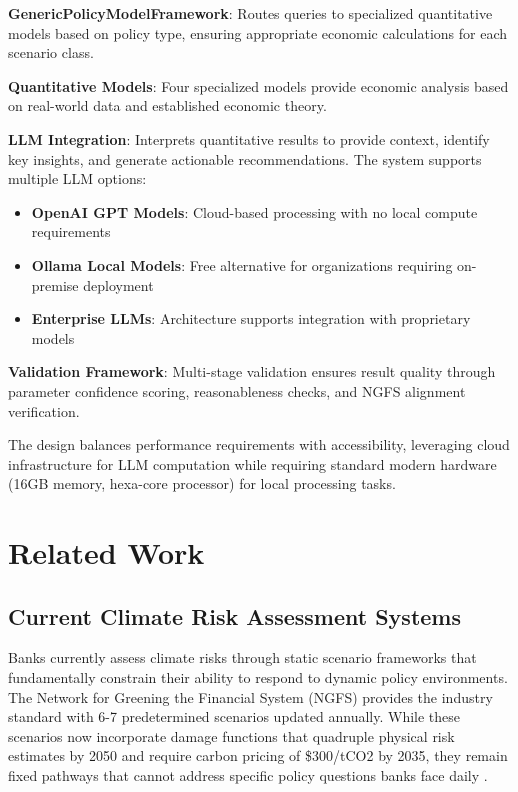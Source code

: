 \documentclass[conference]{IEEEtran}
\begin{document}
\textbf{GenericPolicyModelFramework}: Routes queries to specialized quantitative models based on policy type, ensuring appropriate economic calculations for each scenario class.

\textbf{Quantitative Models}: Four specialized models provide economic analysis based on real-world data and established economic theory.

\textbf{LLM Integration}: Interprets quantitative results to provide context, identify key insights, and generate actionable recommendations. The system supports multiple LLM options:
\begin{itemize}
\item \textbf{OpenAI GPT Models}: Cloud-based processing with no local compute requirements
\item \textbf{Ollama Local Models}: Free alternative for organizations requiring on-premise deployment
\item \textbf{Enterprise LLMs}: Architecture supports integration with proprietary models
\end{itemize}

\textbf{Validation Framework}: Multi-stage validation ensures result quality through parameter confidence scoring, reasonableness checks, and NGFS alignment verification.

The design balances performance requirements with accessibility, leveraging cloud infrastructure for LLM computation while requiring standard modern hardware (16GB memory, hexa-core processor) for local processing tasks.

\section{Related Work}

\subsection{Current Climate Risk Assessment Systems}

Banks currently assess climate risks through static scenario frameworks that fundamentally constrain their ability to respond to dynamic policy environments. The Network for Greening the Financial System (NGFS) provides the industry standard with 6-7 predetermined scenarios updated annually. While these scenarios now incorporate damage functions that quadruple physical risk estimates by 2050 and require carbon pricing of \$300/tCO2 by 2035, they remain fixed pathways that cannot address specific policy questions banks face daily \cite{feridun2020climate}.
\end{document}

